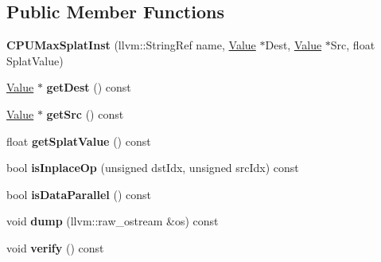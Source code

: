 \subsection*{Public Member Functions}
\begin{DoxyCompactItemize}
\item 
\mbox{\label{classglow_1_1_c_p_u_max_splat_inst_a61cbe99cd549bda536cbe109754ad56f}} 
{\bfseries C\+P\+U\+Max\+Splat\+Inst} (llvm\+::\+String\+Ref name, \hyperlink{classglow_1_1_value}{Value} $\ast$Dest, \hyperlink{classglow_1_1_value}{Value} $\ast$Src, float Splat\+Value)
\item 
\mbox{\label{classglow_1_1_c_p_u_max_splat_inst_af4641d7557ce7f1d94a21a41c796b0ab}} 
\hyperlink{classglow_1_1_value}{Value} $\ast$ {\bfseries get\+Dest} () const
\item 
\mbox{\label{classglow_1_1_c_p_u_max_splat_inst_adb1f1782e6e53ee0656bfb54b1985d91}} 
\hyperlink{classglow_1_1_value}{Value} $\ast$ {\bfseries get\+Src} () const
\item 
\mbox{\label{classglow_1_1_c_p_u_max_splat_inst_a3425d858b37c9dbe9f6ceb3bd92b0ddf}} 
float {\bfseries get\+Splat\+Value} () const
\item 
\mbox{\label{classglow_1_1_c_p_u_max_splat_inst_a225d29585446dd8e457edccc50bc4a7c}} 
bool {\bfseries is\+Inplace\+Op} (unsigned dst\+Idx, unsigned src\+Idx) const
\item 
\mbox{\label{classglow_1_1_c_p_u_max_splat_inst_ad3f26ac8b33a437dd3877d268307548a}} 
bool {\bfseries is\+Data\+Parallel} () const
\item 
\mbox{\label{classglow_1_1_c_p_u_max_splat_inst_a49437ce741f218077f7140ea7f100746}} 
void {\bfseries dump} (llvm\+::raw\+\_\+ostream \&os) const
\item 
\mbox{\label{classglow_1_1_c_p_u_max_splat_inst_a53d8b404dd27125649571b9227679ed6}} 
void {\bfseries verify} () const
\end{DoxyCompactItemize}
